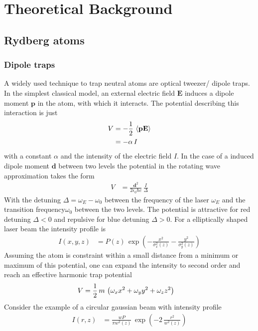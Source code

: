 \chapter{Theoretical Background}

\section{Rydberg atoms}
\subsection{Dipole traps}\label{sec:dipole traps}
A widely used technique to trap neutral atoms are optical tweezer/ dipole traps. In the simplest classical model, an external electric field $\mathbf{E}$ induces a dipole moment $\mathbf{p}$ in the atom, with which it interacts. The potential describing this interaction is just
\begin{align*}
    V &= -\frac{1}{2}\,\braket{\mathbf{p}\mathbf{E}}\\
    &=-\alpha\, I
\end{align*}
with a constant $\alpha$ and the intensity of the electric field $I$. In the case of a induced dipole moment $\mathbf{d}$ between two levels the potential in the rotating wave approximation takes the form
\begin{align*}
    V &= \frac{\mathbf{d}^2}{2\epsilon_0\hbar c}\,\frac{I}{\Delta}
\end{align*}
With the detuning $\Delta=\omega_E-\omega_0$ between the frequency of the laser $\omega_E$ and the transition frequency$\omega_0$ between the two levels. The potential is attractive for red detuning $\Delta<0$ and repulsive for blue detuning $\Delta>0$.
For a elliptically shaped laser beam \cite{oechsnerAnamorphicShapingLaser2019} the intensity profile is \cite{grimmOpticalDipoleTraps1999}
\begin{align*}
    I(x,y,z)&= P(z)\,\exp\left(-\frac{x^2}{\sigma_x^2(z)}-\frac{y^2}{\sigma_y^2(z)}\right)
\end{align*}
Assuming the atom is constraint within a small distance from a minimum or maximum of this potential, one can expand the intensity to second order and reach an effective harmonic trap potential 
\begin{align*}
    V&= \frac{1}{2}\,m\,\left(\omega_xx^2+\omega_y y^2+ \omega_zz^2\right)
\end{align*}
Consider the example of a circular gaussian beam with intensity profile
\begin{align*}
    I(r,z)&=\frac{wP}{\pi w^2(z)}\,\exp\left(-2\,\frac{r^2}{w^2(z)}\right)
\end{align*}
